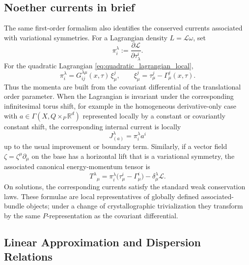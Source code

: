 \documentclass[11pt]{amsart}
\theoremstyle{plain}
\theoremstyle{definition}
\theoremstyle{remark}
\begin{document}
\subsection{Noether currents in brief}
\label{subsec:noether_brief}

The same first-order formalism also identifies the conserved currents associated with variational symmetries. 
For a Lagrangian density \(L=\mathcal L\omega\), set
\begin{equation}
	\pi_i^\lambda:=\frac{\partial\mathcal L}{\partial \tau^i_\lambda}.
	\label{eq:canonical_momenta_brief}
\end{equation}
For the quadratic Lagrangian \eqref{eq:quadratic_lagrangian_local},
\begin{equation}
	\pi_i^\lambda
	=
	G^{\lambda\mu}_{ij}(x,\tau)\,\xi^j_\mu,
	\qquad
	\xi^j_\mu=\tau^j_\mu-\Gamma^j_\mu(x,\tau).
	\label{eq:quadratic_momenta_brief}
\end{equation}
Thus the momenta are built from the covariant differential of the translational order parameter. 
When the Lagrangian is invariant under the corresponding infinitesimal torus shift, for example in the homogeneous derivative-only case with \(a \in \Gamma(X,Q\times_P\mathbb R^d)\) represented locally by a constant or covariantly constant shift, the corresponding internal current is locally
\begin{equation}
	J^\lambda_{(a)}=\pi_i^\lambda a^i
	\label{eq:internal_current_brief}
\end{equation}
up to the usual improvement or boundary term. 
Similarly, if a vector field \(\zeta=\zeta^\mu\partial_\mu\) on the base has a horizontal lift that is a variational symmetry, the associated canonical energy-momentum tensor is
\begin{equation}
	T^\lambda{}_{\mu}
	=
	\pi_i^\lambda\bigl(\tau^i_\mu-\Gamma^i_\mu\bigr)
	-
	\delta^\lambda_\mu\mathcal L.
	\label{eq:canonical_energy_momentum_tensor}
\end{equation}
On solutions, the corresponding currents satisfy the standard weak conservation laws. 
These formulae are local representatives of globally defined associated-bundle objects; under a change of crystallographic trivialization they transform by the same \(P\)-representation as the covariant differential.

\subsection{Linear Approximation and Dispersion Relations}
\label{subsec:linear_dispersion}
\end{document}
